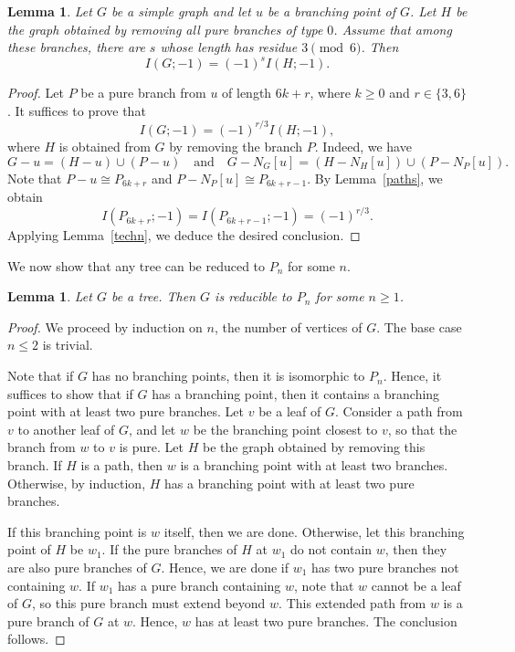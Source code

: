 \documentclass[12pt,amscd]{amsart}
\newtheorem{lem}[thm]{Lemma}
\theoremstyle{definition}
\numberwithin{equation}{section}
\begin{document}
\begin{lem}\label{lem_pure_type_3}
Let \( G \) be a simple graph and let \( u \) be a branching point of \( G \). Let \( H \) be the graph obtained by removing all pure branches of type \( 0 \). Assume that among these branches, there are \( s \) whose length has residue \( 3 \pmod{6} \). Then
\[
I(G;-1) = (-1)^s I(H;-1).
\]
\end{lem}

\begin{proof}
Let \( P \) be a pure branch from \( u \) of length \( 6k + r \), where \( k \ge 0 \) and \( r \in \{3,6\} \). It suffices to prove that
\[
I(G;-1) = (-1)^{r/3} I(H;-1),
\]
where \( H \) is obtained from \( G \) by removing the branch \( P \). Indeed, we have
\[
G - u = (H - u) \cup (P - u)
\quad \text{and} \quad
G - N_G[u] = (H - N_H[u]) \cup (P - N_P[u]).
\]
Note that \( P - u \cong P_{6k+r} \) and \( P - N_P[u] \cong P_{6k+r-1} \). By Lemma~\ref{paths}, we obtain
\[
I(P_{6k+r};-1) = I(P_{6k+r-1};-1) = (-1)^{r/3}.
\]
Applying Lemma~\ref{techn}, we deduce the desired conclusion.
\end{proof}

We now show that any tree can be reduced to \( P_n \) for some \( n \).

\begin{lem}\label{lem_reducible_trees}
Let \( G \) be a tree. Then \( G \) is reducible to \( P_n \) for some \( n \ge 1 \).
\end{lem}
\begin{proof}
We proceed by induction on \( n \), the number of vertices of \( G \). The base case \( n \le 2 \) is trivial.

Note that if \( G \) has no branching points, then it is isomorphic to \( P_n \). Hence, it suffices to show that if \( G \) has a branching point, then it contains a branching point with at least two pure branches. Let \( v \) be a leaf of \( G \). Consider a path from \( v \) to another leaf of \( G \), and let \( w \) be the branching point closest to \( v \), so that the branch from \( w \) to \( v \) is pure. Let \( H \) be the graph obtained by removing this branch. If \( H \) is a path, then \( w \) is a branching point with at least two branches. Otherwise, by induction, \( H \) has a branching point with at least two pure branches.

If this branching point is \( w \) itself, then we are done. Otherwise, let this branching point of \( H \) be \( w_1 \). If the pure branches of \( H \) at \( w_1 \) do not contain \( w \), then they are also pure branches of \( G \). Hence, we are done if \( w_1 \) has two pure branches not containing \( w \). If \( w_1 \) has a pure branch containing \( w \), note that \( w \) cannot be a leaf of \( G \), so this pure branch must extend beyond \( w \). This extended path from \( w \) is a pure branch of \( G \) at \( w \). Hence, \( w \) has at least two pure branches. The conclusion follows.
\end{proof}
\end{document}
